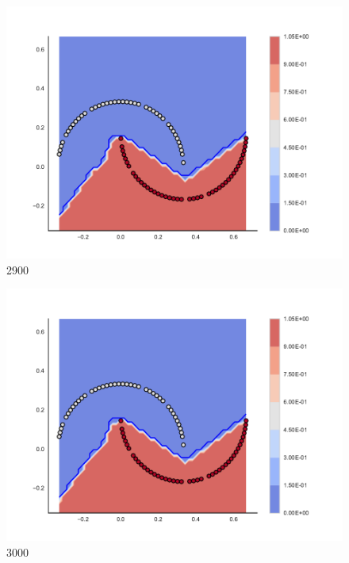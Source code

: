 \begin{subfigure}[b]{0.09\textwidth}
    \includegraphics[clip, trim=2.35cm 1.75cm 4.5cm 0cm,width=\textwidth]{img/convergence/2900.pdf}
    \caption{2900}
    \label{fig:convergence_2900}
\end{subfigure}
%
\begin{subfigure}[b]{0.09\textwidth}
    \includegraphics[clip, trim=2.35cm 1.75cm 4.5cm 0cm,width=\textwidth]{img/convergence/3000.pdf}
    \caption{3000}
    \label{fig:convergence_3000}
\end{subfigure}
%
